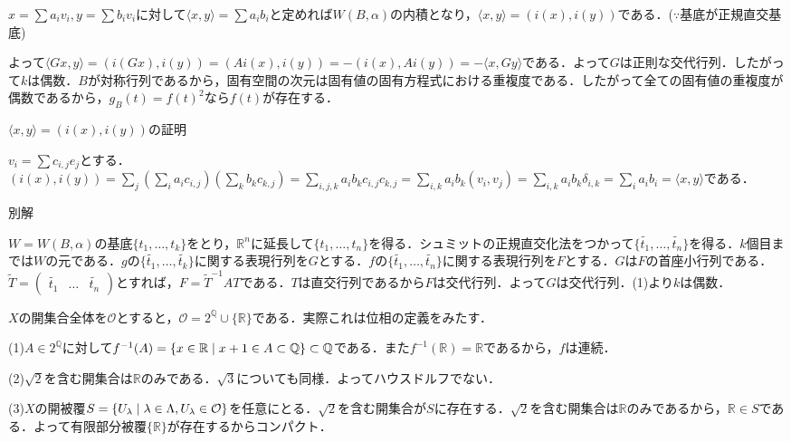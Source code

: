 \documentclass[
		book,
		head_space=20mm,
		foot_space=20mm,
		gutter=10mm,
		line_length=190mm
]{jlreq}
\begin{document}
$x=\sum a_iv_i,y=\sum b_iv_i$に対して$\langle x,y\rangle=\sum a_ib_i$と定めれば$W(B,\alpha)$の内積となり，$\langle x,y \rangle=(i(x),i(y))$である．($\because $基底が正規直交基底)

よって$\langle Gx,y \rangle=(i(Gx),i(y))=(Ai(x),i(y))=-(i(x),Ai(y))=-\langle x,Gy \rangle$である．よって$G$は正則な交代行列．したがって$k$は偶数．$B$が対称行列であるから，固有空間の次元は固有値の固有方程式における重複度である．したがって全ての固有値の重複度が偶数であるから，$g_B(t)=f(t)^2$なら$f(t)$が存在する．
\begin{tcolorbox}[blanker,breakable,
    left=3mm,right=3mm,
    borderline vertical={1pt}{0pt}{black,dotted}]
    $\langle x,y \rangle=(i(x),i(y))$の証明

    $v_i=\sum c_{i,j}e_j$とする．
    $(i(x),i(y))=\sum_j (\sum_i a_ic_{i,j})(\sum_k b_kc_{k,j})=\sum_{i,j,k}a_ib_kc_{i,j}c_{k,j}=\sum_{i,k}a_ib_k(v_i,v_j)=\sum_{i,k}a_ib_k\delta_{i,k}=\sum_i a_ib_i=\langle x,y \rangle$である．
    \end{tcolorbox}
\begin{tcolorbox}[blanker,breakable,
    left=3mm,right=3mm,
    borderline vertical={1pt}{0pt}{black,dotted}]
    別解

    $W=W(B,\alpha)$の基底$\{t_1,\dots,t_k\}$をとり，$\mathbb{R}^n$に延長して$\{t_1,\dots,t_n\}$を得る．シュミットの正規直交化法をつかって$\{\tilde{t_1},\dots,\tilde{t_n}\}$を得る．$k$個目までは$W$の元である．$g$の$\{\tilde{t_1},\dots,\tilde{t_k}\}$に関する表現行列を$G$とする．$f$の$\{\tilde{t_1},\dots,\tilde{t_n}\}$に関する表現行列を$F$とする．$G$は$F$の首座小行列である．$\tilde {T}=\begin{pmatrix}
    \tilde{t_1}&\dots&\tilde{t_n}
    \end{pmatrix}$とすれば，$F=\tilde{T}^{-1}AT$である．$T$は直交行列であるから$F$は交代行列．よって$G$は交代行列．(1)より$k$は偶数．
\end{tcolorbox} 

$X$の開集合全体を$\mathcal{O}$とすると，$\mathcal{O}=2^\mathbb{Q}\cup \{\mathbb{R}\}$である．実際これは位相の定義をみたす．

(1)$A \in 2^\mathbb{Q}$に対して$f^{-1}(A)=\left\{ x \in \mathbb{R}\mathrel{}\middle|\mathrel{} x+1 \in A \subset \mathbb{Q}\right\}\subset \mathbb{Q}$である．また$f^{-1}(\mathbb{R})=\mathbb{R}$であるから，$f$は連続．

(2)$\sqrt{2}$を含む開集合は$\mathbb{R}$のみである．$\sqrt{3}$についても同様．よってハウスドルフでない．

(3)$X$の開被覆$S=\left\{ U_\lambda\mathrel{}\middle|\mathrel{} \lambda\in \Lambda,U_\lambda\in \mathcal{O}\right\}$を任意にとる．$\sqrt{2}$を含む開集合が$S$に存在する．$\sqrt{2}$を含む開集合は$\mathbb{R}$のみであるから，$\mathbb{R}\in S$である．よって有限部分被覆$\{ \mathbb{R}\}$が存在するからコンパクト．
\end{document}
